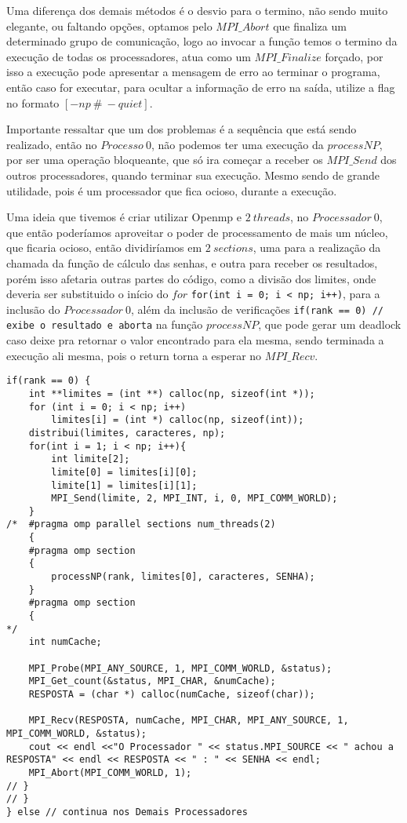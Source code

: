 \documentclass[10pt,journal,compsoc]{IEEEtran}
\begin{document}
Uma diferença dos demais métodos é o desvio para o termino, não sendo muito elegante, ou faltando opções, optamos pelo $MPI\_Abort$ que finaliza um determinado grupo de comunicação, logo ao invocar a função temos o termino da execução de todas os processadores, atua como um $MPI\_Finalize$ forçado, por isso a execução pode apresentar a mensagem de erro ao terminar o programa, então caso for executar, para ocultar a informação de erro na saída, utilize a flag no formato $[-np~\#~-quiet]$.

Importante ressaltar que um dos problemas é a sequência que está sendo realizado, então no $Processo~0$, não podemos ter uma execução da $processNP$, por ser uma operação bloqueante, que só ira começar a receber os $MPI\_Send$ dos outros processadores, quando terminar sua execução. Mesmo sendo de grande utilidade, pois é um processador que fica ocioso, durante a execução.

Uma ideia que tivemos é criar utilizar Openmp e $2~threads$, no $Processador~0$, que então poderíamos aproveitar o poder de processamento de mais um núcleo, que ficaria ocioso, então dividiríamos em $2~sections$, uma para a realização da chamada da função de cálculo das senhas, e outra para receber os resultados, porém isso afetaria outras partes do código, como a divisão dos limites, onde deveria ser substituido o início do $for$ \texttt{for(int i = 0; i < np; i++)}, 
para a inclusão do $Processador~0$, além da inclusão de verificações \texttt{if(rank == 0) // exibe o resultado e aborta} na função $processNP$, que pode gerar um deadlock caso deixe pra retornar o valor encontrado para ela mesma, sendo terminada a execução ali mesma, pois o return torna a esperar no $MPI\_Recv$.

\begin{verbatim}
if(rank == 0) {
    int **limites = (int **) calloc(np, sizeof(int *));
    for (int i = 0; i < np; i++)
        limites[i] = (int *) calloc(np, sizeof(int));
    distribui(limites, caracteres, np);
    for(int i = 1; i < np; i++){
        int limite[2];
        limite[0] = limites[i][0];
        limite[1] = limites[i][1];
        MPI_Send(limite, 2, MPI_INT, i, 0, MPI_COMM_WORLD);
    }
/*  #pragma omp parallel sections num_threads(2)
    {
    #pragma omp section
    {
        processNP(rank, limites[0], caracteres, SENHA);
    }
    #pragma omp section
    {
*/
    int numCache;
    
    MPI_Probe(MPI_ANY_SOURCE, 1, MPI_COMM_WORLD, &status);
    MPI_Get_count(&status, MPI_CHAR, &numCache);
    RESPOSTA = (char *) calloc(numCache, sizeof(char));
    
    MPI_Recv(RESPOSTA, numCache, MPI_CHAR, MPI_ANY_SOURCE, 1, MPI_COMM_WORLD, &status);
    cout << endl <<"O Processador " << status.MPI_SOURCE << " achou a RESPOSTA" << endl << RESPOSTA << " : " << SENHA << endl;
    MPI_Abort(MPI_COMM_WORLD, 1);
// }
// }
} else // continua nos Demais Processadores
\end{verbatim}
\end{document}
